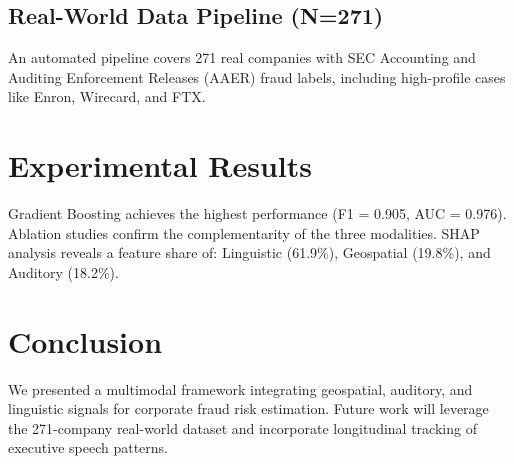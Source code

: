 \documentclass[conference]{IEEEtran}
\begin{document}
\subsection{Real-World Data Pipeline (N=271)}

An automated pipeline covers 271 real companies with SEC Accounting and 
Auditing Enforcement Releases (AAER) fraud labels, including high-profile 
cases like Enron, Wirecard, and FTX.

\section{Experimental Results}

Gradient Boosting achieves the highest performance (F1 = 0.905, AUC = 0.976). 
Ablation studies confirm the complementarity of the three modalities. 
SHAP analysis reveals a feature share of: Linguistic (61.9\%), Geospatial 
(19.8\%), and Auditory (18.2\%).

\section{Conclusion}

We presented a multimodal framework integrating geospatial, auditory, and 
linguistic signals for corporate fraud risk estimation. Future work will 
leverage the 271-company real-world dataset and incorporate longitudinal 
tracking of executive speech patterns.


\end{document}
